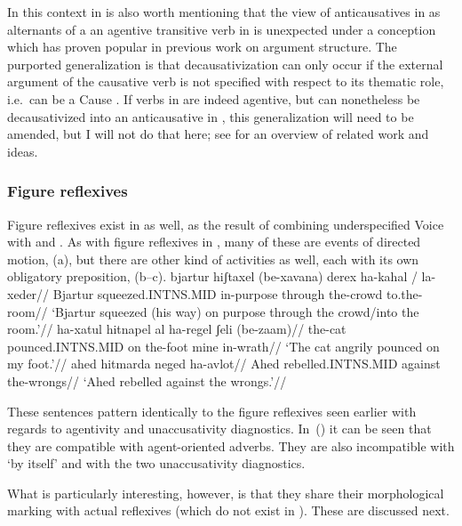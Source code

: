 {In this context in is also worth mentioning that the view of anticausatives in {\thit} as alternants of a an agentive transitive verb in {\tpie} is unexpected under a conception which has proven popular in previous work on argument structure. The purported generalization is that decausativization can only occur if the external argument of the causative verb is not specified with respect to its thematic role, i.e.~can be a Cause \citep{unaccusativity95,reinhart02}. If verbs in {\tpie} are indeed agentive, but can nonetheless be decausativized into an anticausative in {\thit}, this generalization will need to be amended, but I will not do that here; see \citet[52]{layering15} for an overview of related work and ideas.

		\subsubsection{Figure reflexives}	\label{vz:va:easy:figrefl}
Figure reflexives exist in {\thit} as well, as the result of combining underspecified Voice with {\va} and {\pz}. As with figure reflexives in {\tnif}, many of these are events of directed motion, (\nextx a), but there are other kind of activities as well, each with its own obligatory preposition, (\nextx b--c).
\pex
	\a \begingl
		\gla bjartur hiʃtaxel (be-xavana) derex ha-kahal / la-xeder//
		\glb Bjartur squeezed.INTNS.MID in-purpose through the-crowd {} to.the-room//
		\glft `Bjartur squeezed (his way) on purpose through the crowd/into the room.'//
		\endgl
	\a \begingl
		\gla ha-xatul hitnapel al ha-regel ʃeli (be-zaam)//
		\glb the-cat pounced.INTNS.MID on the-foot mine in-wrath//
		\glft `The cat angrily pounced on my foot.'//
		\endgl
	\a \begingl
		\gla ahed hitmarda neged ha-avlot//
		\glb Ahed rebelled.INTNS.MID against the-wrongs//
		\glft `Ahed rebelled against the wrongs.'//
		\endgl
\xe

These sentences pattern identically to the figure reflexives seen earlier with regards to agentivity and unaccusativity diagnostics. In~(\lastx) it can be seen that they are compatible with agent-oriented adverbs. They are also incompatible with `by itself' and with the two unaccusativity diagnostics.

What is particularly interesting, however, is that they share their morphological marking with actual reflexives (which do not exist in {\tnif}). These are discussed next.

}
